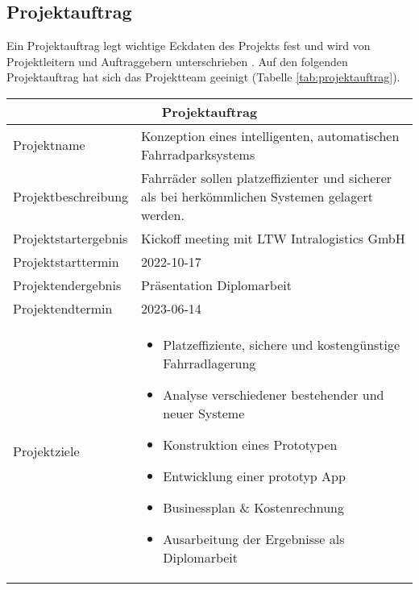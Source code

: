 \subsection{Projektauftrag}

Ein Projektauftrag legt wichtige Eckdaten des Projekts fest und wird von Projektleitern und Auftraggebern unterschrieben . Auf den folgenden Projektauftrag hat sich das Projektteam geeinigt (Tabelle \ref{tab:projektauftrag}).

\begin{longtable}{p{}|p{}}
  \multicolumn{2}{c}{\textbf{Projektauftrag}}                                                                            \\
  \toprule

  Projektname           & Konzeption eines intelligenten, automatischen Fahrradparksystems                               \\ \midrule

  Projektbeschreibung   & Fahrräder sollen platzeffizienter und sicherer als bei herkömmlichen Systemen gelagert werden. \\ \midrule

  Projektstartergebnis  & Kickoff meeting mit LTW Intralogistics GmbH                                                    \\ \midrule

  Projektstarttermin    & 2022-10-17                                                                                     \\ \midrule

  Projektendergebnis    & Präsentation Diplomarbeit                                                                      \\ \midrule

  Projektendtermin      & 2023-06-14                                                                                     \\ \midrule

  Projektziele          &
  \begin{itemize}
    \item Platzeffiziente, sichere und kostengünstige Fahrradlagerung
    \item Analyse verschiedener bestehender und neuer Systeme
    \item Konstruktion eines Prototypen
    \item Entwicklung einer prototyp App
    \item Businessplan \& Kostenrechnung
    \item Ausarbeitung der Ergebnisse als Diplomarbeit
  \end{itemize}                                                       \\  \midrule


\end{longtable}
